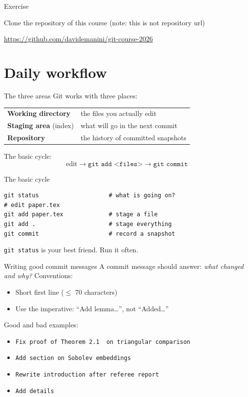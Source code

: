 \documentclass[11pt]{beamer}
\newcommand{\exercise}[1]{
  \begin{frame}{Exercise}
    #1
  \end{frame}
}
\begin{document}
\exercise{
  Clone the repository of this course (note: this is not
  repository url)

  \url{https://github.com/davidemanini/git-course-2026}
}

\section{Daily workflow}

\begin{frame}{The three areas}
  Git works with three places:
  \vfill
  \begin{center}
  \begin{tabular}{ll}
    \textbf{Working directory} & the files you actually edit \\
    \textbf{Staging area} (index) & what will go in the next commit \\
    \textbf{Repository} & the history of committed snapshots \\
  \end{tabular}
  \end{center}
  \vfill
  The basic cycle:
  \[
    \text{edit} \longrightarrow \texttt{git add <files>} \longrightarrow \texttt{git commit}
  \]
\end{frame}

\begin{frame}[fragile]{The basic cycle}
\begin{lstlisting}
git status                    # what is going on?
# edit paper.tex
git add paper.tex             # stage a file
git add .                     # stage everything
git commit                    # record a snapshot
\end{lstlisting}
  \vfill
  \texttt{git status} is your best friend. Run it often.
\end{frame}

\begin{frame}{Writing good commit messages}
  A commit message should answer: \emph{what changed and why?}
  \vfill
  Conventions:
  \begin{itemize}
    \item Short first line (${\leq}$ 70 characters)
    \item Use the imperative: ``Add lemma\ldots'', not ``Added\ldots''
  \end{itemize}
  \vfill
  {\color{blue}Good} and {\color{red} bad} examples:
  \begin{itemize}
  \item \texttt{Fix proof of Theorem
      {\color{red}2.1}
    {\color{blue} on triangular comparison}}
    \item \texttt{Add section on Sobolev embeddings}
    \item \texttt{Rewrite introduction after referee report}
      \item \texttt{\color{red}Add details}
  \end{itemize}
\end{frame}
\end{document}
